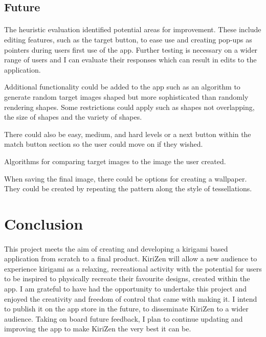 \documentclass[11pt]{article}
\begin{document}
    \subsection{Future}
                \paragraph{}
                
                The heuristic evaluation identified potential areas for improvement. These include editing features, such as the target button, to ease use and creating pop-ups as pointers during users first use of the app. Further testing is necessary on a wider range of users and I can evaluate their responses which can result in edits to the application. 
                
                Additional functionality could be added to the app such as an algorithm to generate random target images shaped but more sophisticated than randomly rendering shapes. Some restrictions could apply such as shapes not overlapping, the size of shapes and the variety of shapes.
                
                There could also be easy, medium, and hard levels or a next button within the match button section so the user could move on if they wished. 
                
                Algorithms for comparing target images to the image the user created.

                When saving the final image, there could be options for creating a wallpaper. They could be created by repeating the pattern
                along the style of tessellations. 

\newpage
\section{Conclusion}
        
            \paragraph{}
            This project meets the aim of creating and developing a kirigami based application from scratch to a final product. KiriZen will allow a new audience to experience kirigami as a relaxing, recreational activity with the potential for users to be inspired to physically recreate their favourite designs, created within the app. I am grateful to have had the opportunity to undertake this project and enjoyed the creativity and freedom of control that came with making it. I intend to publish it on the app store in the future, to disseminate KiriZen to a wider audience. Taking on board future feedback, I plan to continue updating and improving the app to make KiriZen the very best it can be.
\end{document}
